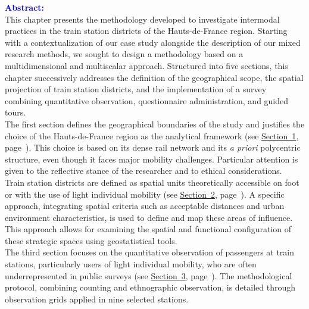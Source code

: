 \begin{refsegment}
    \newpage
    \begin{tcolorbox}[colback=white!5!white,
                      colframe=blue!75!blue,
                      title=
                      \bigskip
                      \center{\textbf{Preamble of Chapter~3}}
                      \\
                      \raggedright{\small{Chapter composed of \pagedifference{chap3:titre}{part1:conclusion} pages, including \pagedifference{chap3:bibliographie}{part1:conclusion} pages of bibliography}}
                      \bigskip]
\Large{\textcolor{blue}{\textbf{Abstract:}}}
    \\
    \small{
This chapter presents the methodology developed to investigate intermodal practices in the train station districts of the Hauts-de-France region. Starting with a contextualization of our case study alongside the description of our mixed research methods, we sought to design a methodology based on a multidimensional and multiscalar approach. Structured into five sections, this chapter successively addresses the definition of the geographical scope, the spatial projection of train station districts, and the implementation of a survey combining quantitative observation, questionnaire administration, and guided tours.%
    \\
The first section defines the geographical boundaries of the study and justifies the choice of the Hauts-de-France region as the analytical framework (see \hyperref[chap3:region-hauts-de-france]{Section~1}, page~\pageref{chap3:region-hauts-de-france}). This choice is based on its dense rail network and its \textsl{a priori} polycentric structure, even though it faces major mobility challenges. Particular attention is given to the reflective stance of the researcher and to ethical considerations.%
    \\
Train station districts are defined as spatial units theoretically accessible on foot or with the use of light individual mobility (see \hyperref[chap3:quartiers-gare]{Section~2}, page~\pageref{chap3:quartiers-gare}). A specific approach, integrating spatial criteria such as acceptable distances and urban environment characteristics, is used to define and map these areas of influence. This approach allows for examining the spatial and functional configuration of these strategic spaces using geostatistical tools.%
    \\
The third section focuses on the quantitative observation of passengers at train stations, particularly users of light individual mobility, who are often underrepresented in public surveys (see \hyperref[chap3:observation-quantitative]{Section~3}, page~\pageref{chap3:observation-quantitative}). The methodological protocol, combining counting and ethnographic observation, is detailed through observation grids applied in nine selected stations.%
}
\end{tcolorbox}
\end{refsegment}
